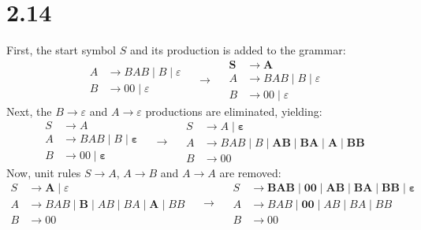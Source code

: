 \documentclass[12pt]{article}
\begin{document}
\section*{2.14}
First, the start symbol $S$ and its production is added to the grammar:
\begin{equation*}
	\begin{split}
		A &\rightarrow BAB \; | \; B \; | \; \varepsilon\\
		B &\rightarrow 00 \; | \; \varepsilon
	\end{split}
\quad\longrightarrow\quad
	\begin{split}
		\mathbf{S} &\rightarrow \mathbf{A}\\
    	A &\rightarrow BAB \; | \; B \; | \; \varepsilon\\
		B &\rightarrow 00 \; | \; \varepsilon
    \end{split}
\end{equation*}
Next, the $B \rightarrow \varepsilon$ and $A \rightarrow \varepsilon$ productions are eliminated, yielding:
\begin{equation*}
	\begin{split}
		S &\rightarrow A\\
    	A &\rightarrow BAB \; | \; B \; | \; \bm{\varepsilon}\\
		B &\rightarrow 00 \; | \; \bm{\varepsilon}
    \end{split}
\quad\longrightarrow\quad
	\begin{split}
		S &\rightarrow A \; | \; \bm{\varepsilon}\\
    	A &\rightarrow BAB \; | \; B \; | \; \mathbf{AB} \; | \; \mathbf{BA} \; | \; \mathbf{A} \; | \; \mathbf{BB}\\
		B &\rightarrow 00
    \end{split}
\end{equation*}
Now, unit rules $S \rightarrow A$, $A \rightarrow B$ and $A \rightarrow A$ are removed:
\begin{equation*}
	\begin{split}
		S &\rightarrow \mathbf{A} \; | \; \varepsilon\\
    	A &\rightarrow BAB \; | \; \mathbf{B} \; | \; AB \; | \; BA \; | \; \mathbf{A} \; | \; BB\\
		B &\rightarrow 00
    \end{split}
\quad\longrightarrow\quad
	\begin{split}
		S &\rightarrow \mathbf{BAB \; | \; 00 \; | \; AB \; | \; BA \; | \; BB \; | \; \varepsilon}\\
    	A &\rightarrow BAB \; | \; \mathbf{00} \; | \; AB \; | \; BA \; | \; BB\\
		B &\rightarrow 00
    \end{split}
\end{equation*}
\end{document}
